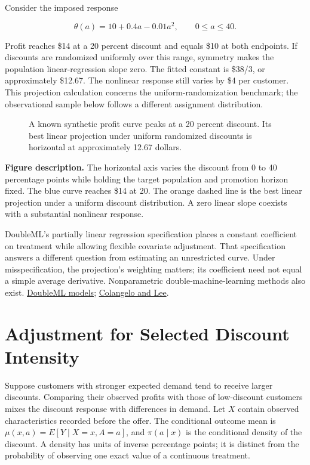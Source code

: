Consider the imposed response

\[
\theta(a)=10+0.4a-0.01a^2,\qquad 0\leq a\leq40.
\]

Profit reaches \$14 at a 20 percent discount and equals \$10 at both
endpoints. If discounts are randomized uniformly over this range,
symmetry makes the population linear-regression slope zero. The fitted
constant is \$38/3, or approximately \$12.67. The nonlinear response
still varies by \$4 per customer. This projection calculation concerns
the uniform-randomization benchmark; the observational sample below
follows a different assignment distribution.

\begin{figure}[htbp]
\centering

\caption{A known synthetic profit curve peaks at a 20 percent discount. Its best linear projection under uniform randomized discounts is horizontal at approximately 12.67 dollars.}\label{fig:M06_discount_response}
\end{figure}

\textbf{Figure description.} The horizontal axis varies the discount
from 0 to 40 percentage points while holding the target population and
promotion horizon fixed. The blue curve reaches \$14 at 20. The orange
dashed line is the best linear projection under a uniform discount
distribution. A zero linear slope coexists with a substantial nonlinear
response.

DoubleML's partially linear regression specification places a constant
coefficient on treatment while allowing flexible covariate adjustment.
That specification answers a different question from estimating an
unrestricted curve. Under misspecification, the projection's weighting
matters; its coefficient need not equal a simple average derivative.
Nonparametric double-machine-learning methods also exist.
\href{https://docs.doubleml.org/stable/guide/models.html}{DoubleML
models}; \href{https://arxiv.org/abs/2004.03036}{Colangelo and Lee}.

\hypertarget{M06-adjustment-for-selected-discount-intensity}{%
\section{Adjustment for Selected Discount
Intensity}\label{M06-adjustment-for-selected-discount-intensity}}

\noindent \noindent Suppose customers with stronger expected demand tend to
receive larger discounts. Comparing their observed profits with those of
low-discount customers mixes the discount response with differences in
demand. Let \(X\) contain observed characteristics recorded before the
offer. The conditional outcome mean is \(\mu(x,a)=E[Y\mid X=x,A=a]\),
and \(\pi(a\mid x)\) is the conditional density of the discount. A
density has units of inverse percentage points; it is distinct from the
probability of observing one exact value of a continuous treatment.

